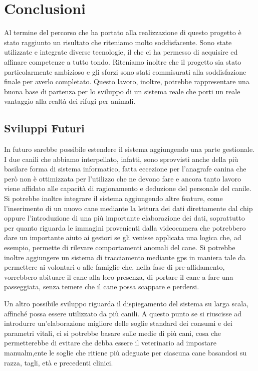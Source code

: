 

\chapter{Conclusioni}
Al termine del percorso che ha portato alla realizzazione di questo progetto è stato raggiunto un risultato che riteniamo molto soddisfacente. Sono state utilizzate e integrate diverse tecnologie, il che ci ha permesso di acquisire ed affinare competenze a tutto tondo. Riteniamo inoltre che il progetto sia stato particolarmente ambizioso e gli sforzi sono stati commisurati alla soddisfazione finale per averlo completato. Questo lavoro, inoltre, potrebbe rappresentare una buona base di partenza per lo sviluppo di un sistema reale che porti un reale vantaggio alla realtà dei rifugi per animali. 
    \section{Sviluppi Futuri}
    In futuro sarebbe possibile estendere il sistema aggiungendo una parte gestionale. I due canili che abbiamo interpellato, infatti, sono sprovvisti anche della più basilare forma di sistema informatico, fatta eccezione per l'anagrafe canina che però non è ottimizzata per l'utilizzo che ne devono fare e ancora tanto lavoro viene affidato alle capacità di ragionamento e deduzione del personale del canile. 
    Si potrebbe inoltre integrare il sistema aggiungendo altre feature, come l'inserimento di un nuovo cane mediante la lettura dei dati direttamente dal chip oppure l'introduzione di una più importante elaborazione dei dati, soprattutto per quanto riguarda le immagini provenienti dalla videocamera che potrebbero dare un importante aiuto ai gestori se gli venisse applicata una logica che, ad esempio, permette di rilevare comportamenti anomali del cane. Si potrebbe inoltre aggiungere un sistema di tracciamento mediante gps in maniera tale da permettere ai volontari o alle famiglie che, nella fase di pre-affidamento, vorrebbero abituare il cane alla loro presenza, di portare il cane a fare una passeggiata, senza temere che il cane possa scappare e perdersi.
    
    Un altro possibile sviluppo riguarda il dispiegamento del sistema su larga scala, affinché possa essere utilizzato da più canili. A questo punto se si riuscisse ad introdurre un'elaborazione migliore delle soglie standard dei consumi e dei parametri vitali, ci si potrebbe basare sulle medie di più cani, cosa che permetterebbe di evitare che debba essere il veterinario ad impostare manualm,ente le soglie che ritiene più adeguate per ciascuna cane basandosi su razza, tagli, età e precedenti clinici.
